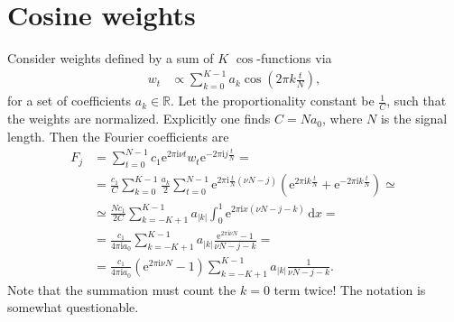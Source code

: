 \documentclass[english, parskip=full]{scrartcl}
\title{\titel}
\date{\today}
\newcommand{\intx}{}
\newcommand{\kla}{}
\renewcommand{\i}{\text{i}}
\newcommand{\e}{\text{e}}
\begin{document}
\maketitle  %

\section{Cosine weights}

Consider weights defined by a sum of $K$ $\cos$-functions via
\begin{align}
w_t &\propto \sum_{k=0}^{K-1} a_k\cos \kla\left( {2\pi k \frac{t}{N}} \right),
\end{align}
for a set of coefficients $a_k\in\mathbb{R}$.
Let the proportionality constant be $\frac{1}{C}$, such that the weights are normalized.
Explicitly one finds $C=Na_0$, where $N$ is the signal length.
Then the Fourier coefficients are
\begin{align}
F_j &= \sum_{t=0}^{N-1} c_1\e^{2\pi\i \nu t} w_t \e^{-2\pi\i j\frac{t}{N}} = \\
&= \frac{c_1}{C} \sum_{k=0}^{K-1} \frac{a_k}{2} \sum_{t=0}^{N-1} \e^{2\pi\i\frac{t}{N}(\nu N - j)} \kla\left( {\e^{2\pi\i k \frac{t}{N}} + \e^{-2\pi\i k \frac{t}{N}}} \right) \simeq \\
&\simeq \frac{Nc_1}{2C} \sum_{k=-K+1}^{K-1} a_{|k|}  \intx\int_{0}^{1} \e^{2\pi\i x(\nu N - j - k)} \,\mathrm{d}x = \\
&= \frac{c_1}{4\pi\i a_0} \sum_{k=-K+1}^{K-1} a_{|k|} \frac{\e^{2\pi\i \nu N} - 1}{\nu N - j - k} = \\
&= \frac{c_1}{4\pi\i a_0} \kla\left( {\e^{2\pi\i \nu N} - 1} \right) \sum_{k=-K+1}^{K-1} a_{|k|} \frac{1}{\nu N - j - k}.
\end{align}
Note that the summation must count the $k=0$ term twice! 
The notation is somewhat questionable.
\end{document}
